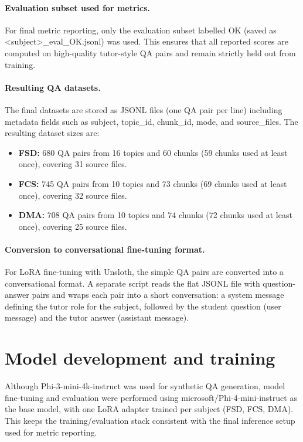 \paragraph{Evaluation subset used for metrics.}
For final metric reporting, only the evaluation subset labelled OK (saved as <subject>\_eval\_OK.jsonl) was used. This ensures that all reported scores are computed on high-quality tutor-style QA pairs and remain strictly held out from training.

\paragraph{Resulting QA datasets.}
The final datasets are stored as JSONL files (one QA pair per line) including metadata fields such as subject, topic\_id, chunk\_id, mode, and source\_files. The resulting dataset sizes are:
\begin{itemize}
    \item \textbf{FSD:} 680 QA pairs from 16 topics and 60 chunks (59 chunks used at least once), covering 31 source files.
    \item \textbf{FCS:} 745 QA pairs from 10 topics and 73 chunks (69 chunks used at least once), covering 32 source files.
    \item \textbf{DMA:} 708 QA pairs from 10 topics and 74 chunks (72 chunks used at least once), covering 25 source files.
\end{itemize}

\paragraph{Conversion to conversational fine-tuning format.}
For LoRA fine-tuning with Unsloth, the simple QA pairs are converted into a conversational format. A separate script reads the flat JSONL file with question-answer pairs and wraps each pair into a short conversation: a system message defining the tutor role for the subject, followed by the student question (user message) and the tutor answer (assistant message).

\section{Model development and training}
Although Phi-3-mini-4k-instruct was used for synthetic QA generation, model fine-tuning and evaluation were performed using microsoft/Phi-4-mini-instruct as the base model, with one LoRA adapter trained per subject (FSD, FCS, DMA). This keeps the training/evaluation stack consistent with the final inference setup used for metric reporting.


